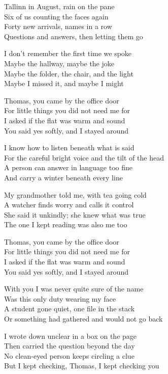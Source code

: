 \begin{lyrics}
Tallinn in August, rain on the pane\\
Six of us counting the faces again\\
Forty new arrivals, names in a row\\
Questions and answers, then letting them go

I don't remember the first time we spoke\\
Maybe the hallway, maybe the joke\\
Maybe the folder, the chair, and the light\\
Maybe I missed it, and maybe I might

Thomas, you came by the office door\\
For little things you did not need me for\\
I asked if the flat was warm and sound\\
You said yes softly, and I stayed around

I know how to listen beneath what is said\\
For the careful bright voice and the tilt of the head\\
A person can answer in language too fine\\
And carry a winter beneath every line

My grandmother told me, with tea going cold\\
A watcher finds worry and calls it control\\
She said it unkindly; she knew what was true\\
The one I kept reading was also me too

Thomas, you came by the office door\\
For little things you did not need me for\\
I asked if the flat was warm and sound\\
You said yes softly, and I stayed around

With you I was never quite sure of the name\\
Was this only duty wearing my face\\
A student gone quiet, one file in the stack\\
Or something had gathered and would not go back

I wrote down unclear in a box on the page\\
Then carried the question beyond the day\\
No clean-eyed person keeps circling a clue\\
But I kept checking, Thomas, I kept checking you


\end{lyrics}
